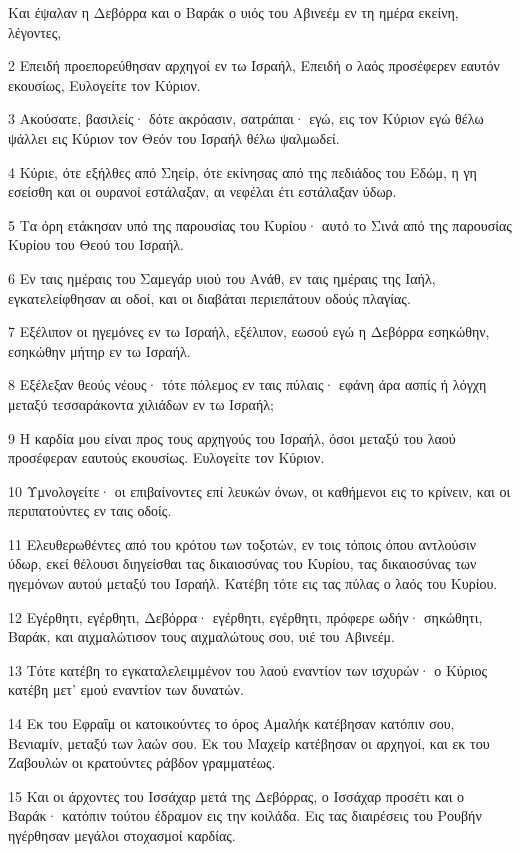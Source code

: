 \par Και έψαλαν η Δεβόρρα και ο Βαράκ ο υιός του Αβινεέμ εν τη ημέρα εκείνη, λέγοντες,
\par 2 Επειδή προεπορεύθησαν αρχηγοί εν τω Ισραήλ, Επειδή ο λαός προσέφερεν εαυτόν εκουσίως, Ευλογείτε τον Κύριον.
\par 3 Ακούσατε, βασιλείς· δότε ακρόασιν, σατράπαι· εγώ, εις τον Κύριον εγώ θέλω ψάλλει εις Κύριον τον Θεόν του Ισραήλ θέλω ψαλμωδεί.
\par 4 Κύριε, ότε εξήλθες από Σηείρ, ότε εκίνησας από της πεδιάδος του Εδώμ, η γη εσείσθη και οι ουρανοί εστάλαξαν, αι νεφέλαι έτι εστάλαξαν ύδωρ.
\par 5 Τα όρη ετάκησαν υπό της παρουσίας του Κυρίου· αυτό το Σινά από της παρουσίας Κυρίου του Θεού του Ισραήλ.
\par 6 Εν ταις ημέραις του Σαμεγάρ υιού του Ανάθ, εν ταις ημέραις της Ιαήλ, εγκατελείφθησαν αι οδοί, και οι διαβάται περιεπάτουν οδούς πλαγίας.
\par 7 Εξέλιπον οι ηγεμόνες εν τω Ισραήλ, εξέλιπον, εωσού εγώ η Δεβόρρα εσηκώθην, εσηκώθην μήτηρ εν τω Ισραήλ.
\par 8 Εξέλεξαν θεούς νέους· τότε πόλεμος εν ταις πύλαις· εφάνη άρα ασπίς ή λόγχη μεταξύ τεσσαράκοντα χιλιάδων εν τω Ισραήλ;
\par 9 Η καρδία μου είναι προς τους αρχηγούς του Ισραήλ, όσοι μεταξύ του λαού προσέφεραν εαυτούς εκουσίως. Ευλογείτε τον Κύριον.
\par 10 Υμνολογείτε· οι επιβαίνοντες επί λευκών όνων, οι καθήμενοι εις το κρίνειν, και οι περιπατούντες εν ταις οδοίς.
\par 11 Ελευθερωθέντες από του κρότου των τοξοτών, εν τοις τόποις όπου αντλούσιν ύδωρ, εκεί θέλουσι διηγείσθαι τας δικαιοσύνας του Κυρίου, τας δικαιοσύνας των ηγεμόνων αυτού μεταξύ του Ισραήλ. Κατέβη τότε εις τας πύλας ο λαός του Κυρίου.
\par 12 Εγέρθητι, εγέρθητι, Δεβόρρα· εγέρθητι, εγέρθητι, πρόφερε ωδήν· σηκώθητι, Βαράκ, και αιχμαλώτισον τους αιχμαλώτους σου, υιέ του Αβινεέμ.
\par 13 Τότε κατέβη το εγκαταλελειμμένον του λαού εναντίον των ισχυρών· ο Κύριος κατέβη μετ' εμού εναντίον των δυνατών.
\par 14 Εκ του Εφραΐμ οι κατοικούντες το όρος Αμαλήκ κατέβησαν κατόπιν σου, Βενιαμίν, μεταξύ των λαών σου. Εκ του Μαχείρ κατέβησαν οι αρχηγοί, και εκ του Ζαβουλών οι κρατούντες ράβδον γραμματέως.
\par 15 Και οι άρχοντες του Ισσάχαρ μετά της Δεβόρρας, ο Ισσάχαρ προσέτι και ο Βαράκ· κατόπιν τούτου έδραμον εις την κοιλάδα. Εις τας διαιρέσεις του Ρουβήν ηγέρθησαν μεγάλοι στοχασμοί καρδίας.

